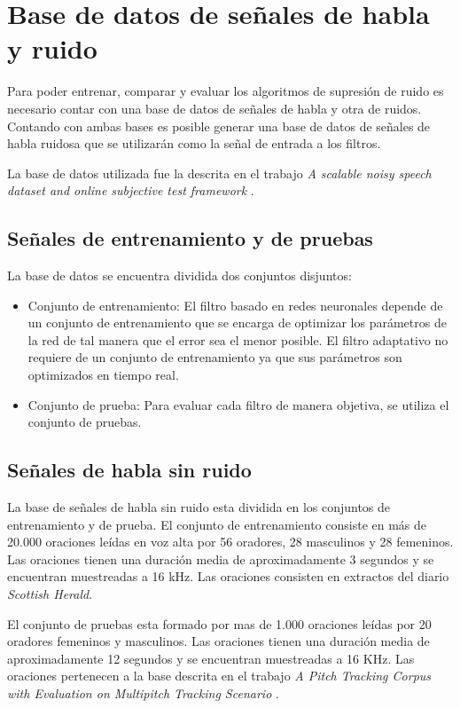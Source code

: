 \section{Base de datos de señales de habla y ruido}
\label{sec:audio_db}

Para poder entrenar, comparar y evaluar los algoritmos de supresión de ruido es necesario contar con una base de datos de señales de habla y otra de ruidos. Contando con ambas bases es posible generar una base de datos de señales de habla ruidosa que se utilizarán como la señal de entrada a los filtros.

La base de datos utilizada fue la descrita en el trabajo \emph{A scalable noisy speech dataset and online subjective test framework} \cite{a_scalable_noisy_speech_dataset_and_online_subjective_test_framework}.

\subsection{Señales de entrenamiento y de pruebas}

La base de datos se encuentra dividida dos conjuntos disjuntos:

\begin{itemize}
	\item Conjunto de entrenamiento: El filtro basado en redes neuronales depende de un conjunto de entrenamiento que se encarga de optimizar los parámetros de la red de tal manera que el error sea el menor posible. El filtro adaptativo no requiere de un conjunto de entrenamiento ya que sus parámetros son optimizados en tiempo real.
	\item Conjunto de prueba: Para evaluar cada filtro de manera objetiva, se utiliza el conjunto de pruebas.
\end{itemize}

\subsection{Señales de habla sin ruido}

La base de señales de habla sin ruido esta dividida en los conjuntos de entrenamiento y de prueba. El conjunto de entrenamiento consiste en más de 20.000 oraciones leídas en voz alta por 56 oradores, 28 masculinos y 28 femeninos. Las oraciones tienen una duración media de aproximadamente 3 segundos y se encuentran muestreadas a 16 kHz. Las oraciones consisten en extractos del diario \emph{Scottish Herald}.

El conjunto de pruebas esta formado por mas de 1.000 oraciones leídas por 20 oradores femeninos y masculinos. Las oraciones tienen una duración media de aproximadamente 12 segundos y se encuentran muestreadas a 16 KHz. Las oraciones pertenecen a la base descrita en el trabajo \emph{A Pitch Tracking Corpus with Evaluation on Multipitch Tracking Scenario} \cite{a_pitch_tracking_corpus_with_evaluation_on_multipitch_tracking_scenario}.

